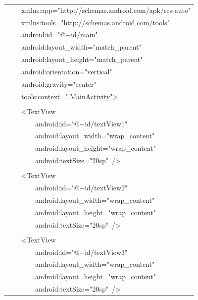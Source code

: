 \documentclass[a4paper,12pt]{article}
\begin{document}
\begin{longtable}{|p{}|}
{\ttfamily\small \ \ \ \ xmlns:app="http://schemas.android.com/apk/res-auto"} \\
{\ttfamily\small \ \ \ \ xmlns:tools="http://schemas.android.com/tools"} \\
{\ttfamily\small \ \ \ \ android:id="@+id/main"} \\
{\ttfamily\small \ \ \ \ android:layout\_width="match\_parent"} \\
{\ttfamily\small \ \ \ \ android:layout\_height="match\_parent"} \\
{\ttfamily\small \ \ \ \ android:orientation="vertical"} \\
{\ttfamily\small \ \ \ \ android:gravity="center"} \\
{\ttfamily\small \ \ \ \ tools:context=".MainActivity"\textgreater{}} \\
\strut \\
{\ttfamily\small \ \ \ \ \textless{}TextView} \\
{\ttfamily\small \ \ \ \ \ \ \ \ android:id="@+id/textView1"} \\
{\ttfamily\small \ \ \ \ \ \ \ \ android:layout\_width="wrap\_content"} \\
{\ttfamily\small \ \ \ \ \ \ \ \ android:layout\_height="wrap\_content"} \\
{\ttfamily\small \ \ \ \ \ \ \ \ android:textSize="20sp"\ /\textgreater{}} \\
\strut \\
{\ttfamily\small \ \ \ \ \textless{}TextView} \\
{\ttfamily\small \ \ \ \ \ \ \ \ android:id="@+id/textView2"} \\
{\ttfamily\small \ \ \ \ \ \ \ \ android:layout\_width="wrap\_content"} \\
{\ttfamily\small \ \ \ \ \ \ \ \ android:layout\_height="wrap\_content"} \\
{\ttfamily\small \ \ \ \ \ \ \ \ android:textSize="20sp"\ /\textgreater{}} \\
\strut \\
{\ttfamily\small \ \ \ \ \textless{}TextView} \\
{\ttfamily\small \ \ \ \ \ \ \ \ android:id="@+id/textView3"} \\
{\ttfamily\small \ \ \ \ \ \ \ \ android:layout\_width="wrap\_content"} \\
{\ttfamily\small \ \ \ \ \ \ \ \ android:layout\_height="wrap\_content"} \\
{\ttfamily\small \ \ \ \ \ \ \ \ android:textSize="20sp"\ /\textgreater{}} \\

\end{longtable}
\end{document}
